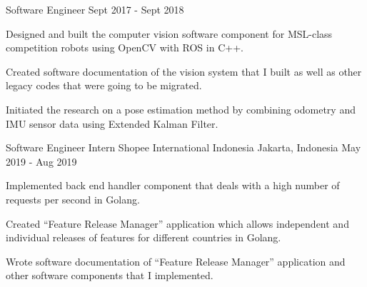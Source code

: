 \begin{cventries}
  \cventry
	{Software Engineer} %
	{} %
	{} %
	{Sept 2017 - Sept 2018} %
	{
	  \begin{cvitems} %
		\item {Designed and built the computer vision software component for MSL-class competition robots using OpenCV with ROS in C++.}
		\item {Created software documentation of the vision system that I built as well as other legacy codes that were going to be migrated.}
        \item {Initiated the research on a pose estimation method by combining odometry and IMU sensor data using Extended Kalman Filter.}
	  \end{cvitems}
	}

\cventry
{Software Engineer Intern} %
{Shopee International Indonesia} %
{Jakarta, Indonesia} %
{May 2019 - Aug 2019} %
{
	\begin{cvitems} %
		\item {Implemented back end handler component that deals with a high number of requests per second in Golang.}
		\item {Created ``Feature Release Manager'' application which allows independent and individual releases of features for different countries in Golang.}
		\item {Wrote software documentation of ``Feature Release Manager'' application and other software components that I implemented.}
	\end{cvitems}
}



\end{cventries}
